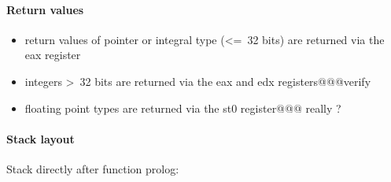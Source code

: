 \paragraph{Return values}

\begin{itemize}
\item return values of pointer or integral type (\textless=\ 32 bits) are returned via the eax register
\item integers \textgreater\ 32 bits are returned via the eax and edx registers@@@verify
\item floating point types are returned via the st0 register@@@ really ?
\end{itemize}


\paragraph{Stack layout}

Stack directly after function prolog:\\

